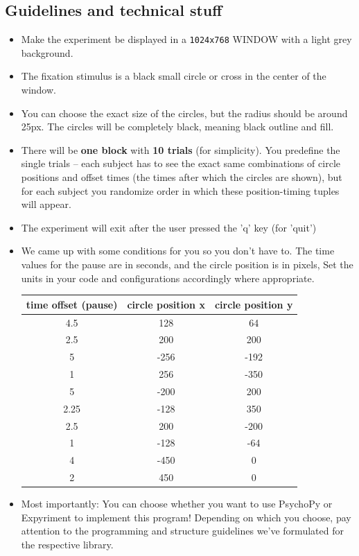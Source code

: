 \subsection{Guidelines and technical stuff}
\begin{itemize}
	\item Make the experiment be displayed in a \texttt{1024x768} WINDOW with a 
		light grey background.
	\item The fixation stimulus is a black small circle or cross in the center of the window.
	\item You can choose the exact size of the circles, but the radius should
		be around 25px. The circles will be completely black, meaning black outline and fill.
	\item There will be \textbf{one block} with \textbf{10 trials} (for simplicity). You predefine
		the single trials -- each subject has to see the exact same
		combinations of circle positions and offset times (the times after which the
		circles are shown), but for each subject you randomize order in which these
		position-timing tuples will appear.
	\item The experiment will exit after the user pressed the 'q' key (for 'quit')
	\item We came up with some conditions for you so you don't have to. The time
	values for the pause are in seconds, and the circle position is in pixels, 
	Set the units in your code and configurations accordingly where appropriate.
		\begin{tabular}{c|cc}
			time offset (pause) & circle position x & circle position y \\
			\hline
			4.5 & 128 & 64\\
			2.5 & 200 & 200\\
			5 & -256 & -192\\
			1 & 256 & -350\\
			5 & -200 & 200\\
			2.25 & -128 & 350\\
			2.5 & 200 & -200\\
			1 & -128 & -64\\
			4 & -450 & 0\\
			2 & 450 & 0

			
		\end{tabular}
	\item Most importantly: You can choose whether you want to use PsychoPy or 
		Expyriment to implement this program! Depending on which you choose, pay 
		attention to the programming and structure guidelines we've formulated for
		the respective library.
\end{itemize}

